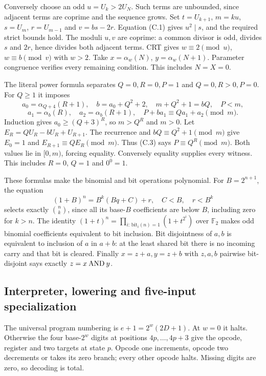 \documentclass[11pt]{article}
\theoremstyle{definition}
\theoremstyle{remark}
\newcommand{\F}{\mathbb F}
\begin{document}
Conversely choose an odd $u=U_k>2U_N$. Such terms are unbounded,
since adjacent terms are coprime and the sequence grows.
Set $t=U_{k+1}$, $m=ku$, $s=U_m$, $r=U_{m-1}$ and $v=bs-2r$.
Equation (C.1) gives $u^2\mid s$, and the required strict bounds hold.
The moduli $u,v$ are coprime: a common divisor is odd, divides $s$
and $2r$, hence divides both adjacent terms. CRT gives
$w\equiv2\pmod u$, $w\equiv b\pmod v$ with $w>2$.
Take $x=\alpha_w(N)$, $y=\alpha_w(N+1)$.
Parameter congruence verifies every remaining condition.
This includes $N=X=0$.

The literal power formula separates $Q=0,R=0,P=1$ and
$Q=0,R>0,P=0$. For $Q\ge1$ it imposes
\[
 a_0=\alpha_{Q+4}(R+1),\quad b=a_0+Q^2+2,\quad
 m+Q^2+1=bQ,\quad P<m,
\]
\[
 a_1=\alpha_b(R),\quad a_2=\alpha_b(R+1),\quad
 P+ba_1\equiv Qa_1+a_2\pmod m.                                  \tag{C.3}
\]
Induction gives $a_0\ge(Q+3)^R$, so $m>Q^R$ and $m>0$.
Let $E_R=Q U_R-bU_R+U_{R+1}$. The recurrence and
$bQ\equiv Q^2+1\pmod m$ give $E_0=1$ and
$E_{R+1}\equiv QE_R\pmod m$. Thus (C.3) says $P\equiv Q^R\pmod m$.
Both values lie in $[0,m)$, forcing equality. Conversely equality
supplies every witness. This includes $R=0$, $Q=1$ and $0^0=1$.

These formulas make the binomial and bit operations polynomial.
For $B=2^{n+1}$, the equation
\[
 (1+B)^n=B^k(Bq+C)+r,\quad C<B,\quad r<B^k
\]
selects exactly $\binom nk$, since all its base-$B$ coefficients
are below $B$, including zero for $k>n$.
The identity
$(1+t)^n=\prod_{i:\,\text{bit}_i(n)=1}(1+t^{2^i})$ over $\F_2$
makes odd binomial coefficients equivalent to bit inclusion.
Bit disjointness of $a,b$ is equivalent to inclusion of $a$ in $a+b$:
at the least shared bit there is no incoming carry and that bit
is cleared. Finally $x=z+a,y=z+b$ with $z,a,b$ pairwise bit-disjoint
says exactly $z=x\mathbin{\rm AND}y$.

\subsection{Interpreter, lowering and five-input specialization}
The universal program numbering is $e+1=2^w(2D+1)$.
At $w=0$ it halts. Otherwise the four base-$2^w$ digits at positions
$4p,\ldots,4p+3$ give the opcode, register and two targets at state $p$.
Opcode one increments, opcode two decrements or takes its zero branch;
every other opcode halts. Missing digits are zero, so decoding is total.
\end{document}
